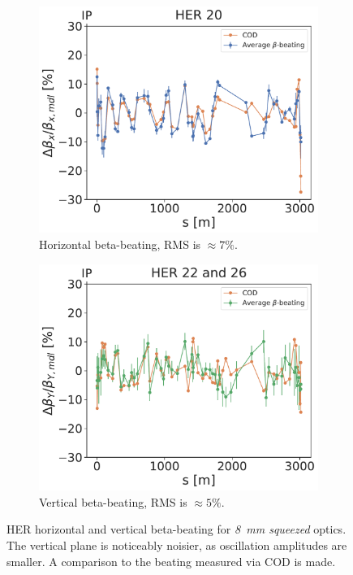 \begin{figure}[!htb]
    \centering
    \begin{subfigure}[b]{0.48\textwidth}
        \includegraphics[width=\linewidth]{images/kek/her_20_bet_x_unzoomed.pdf}
        \caption{Horizontal beta-beating, RMS is $\approx 7\%$.}
    \end{subfigure}
    \hfill
    \begin{subfigure}[b]{0.48\textwidth}
        \includegraphics[width=\linewidth]{images/kek/her_22_26_bet_y_unzoomed.pdf}
        \caption{Vertical beta-beating, RMS is $\approx 5\%$.}
    \end{subfigure}
    \caption{HER horizontal and vertical beta-beating for \textit{8~mm squeezed} optics. The vertical
    plane is noticeably noisier, as oscillation amplitudes are smaller. A comparison to the beating
    measured via COD is made.}
    \label{fig:kek:beating_her_squeezed}
\end{figure}

